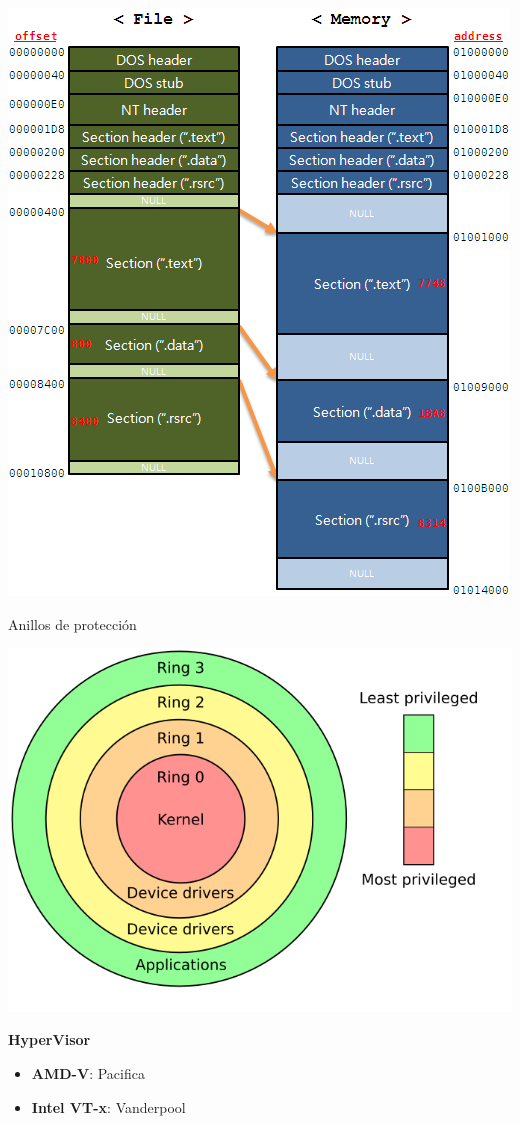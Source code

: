 \documentclass{beamer}
\begin{document}
\begin{frame}[plain]
\begin{center}
\includegraphics[scale=0.4]{pe_sections.png}
\end{center}
\end{frame}

\begin{frame}{Anillos de protección}
 \begin{center}
\includegraphics[scale=0.35]{Priv_rings.png}
\end{center}
\textbf{HyperVisor}
\begin{itemize}
\item \textbf{AMD-V}: Pacifica
\item \textbf{Intel VT-x}: Vanderpool
\end{itemize}
\end{frame}
\end{document}
